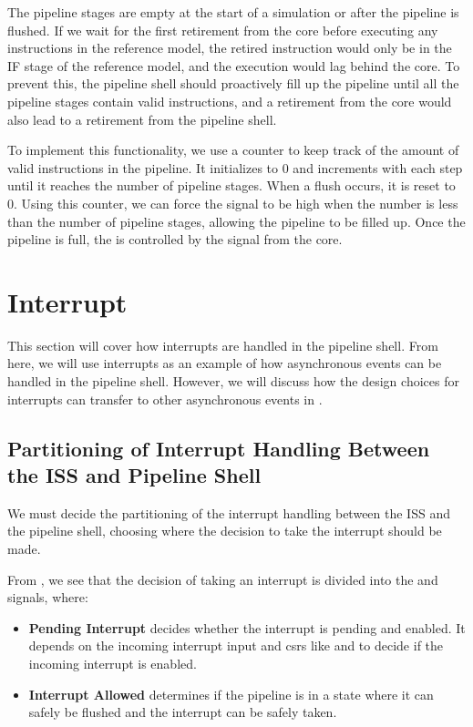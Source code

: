 The pipeline stages are empty at the start of a simulation or after the pipeline is flushed. If we wait for the first retirement from the core before executing any instructions in the reference model, the retired instruction would only be in the IF stage of the reference model, and the execution would lag behind the core. To prevent this, the pipeline shell should proactively fill up the pipeline until all the pipeline stages contain valid instructions, and a retirement from the core would also lead to a retirement from the pipeline shell.

To implement this functionality, we use a  counter to keep track of the amount of valid instructions in the pipeline. It initializes to 0 and increments with each step until it reaches the number of pipeline stages. When a flush occurs, it is reset to 0. Using this counter, we can force the  signal to be high when the number is less than the number of pipeline stages, allowing the pipeline to be filled up. Once the pipeline is full, the  is controlled by the  signal from the core.

\section{Interrupt}%
\label{sec:ps_interrupt}

This section will cover how interrupts are handled in the pipeline shell.
From here, we will use interrupts as an example of how asynchronous events can be handled in the pipeline shell. However, we will discuss how the design choices for interrupts can transfer to other asynchronous events in .


\subsection{Partitioning of Interrupt Handling Between the ISS and Pipeline Shell}

We must decide the partitioning of the interrupt handling between the ISS and the pipeline shell, choosing where the decision to take the interrupt should be made.

From , we see that the decision of taking an interrupt is divided into the  and  signals, where:
\begin{itemize}
    \item \textbf{Pending Interrupt} decides whether the interrupt is pending and enabled. It depends on the incoming  interrupt input and \acrshort{csr}s like  and  to decide if the incoming interrupt is enabled.
    \item \textbf{Interrupt Allowed} determines if the pipeline is in a state where it can safely be flushed and the interrupt can be safely taken.
\end{itemize}

